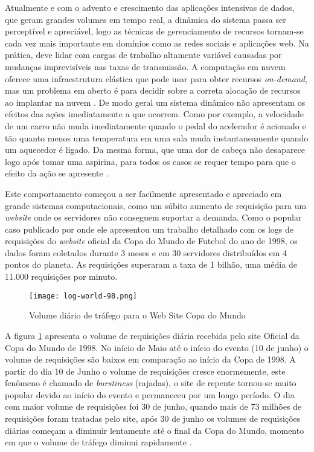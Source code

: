 Atualmente e com o advento e crescimento das aplicações intensivas de dados, que geram grandes volumes em tempo real, a dinâmica do sistema passa ser perceptível e apreciável, logo as técnicas de gerenciamento de recursos tornam-se cada vez mais importante em domínios como as redes sociais e aplicações web. Na prática, deve lidar com cargas de trabalho altamente variável causadas por mudanças imprevisíveis nas taxas de transmissão. A computação em nuvem oferece uma infraestrutura elástica que pode usar para obter recursos \textit{on-demand}, mas um problema em aberto é para decidir sobre a correta alocação de recursos ao implantar na nuvem \cite{Cervino2012}. De modo geral um sistema dinâmico não apresentam os efeitos das ações imediatamente a que ocorrem. Como por exemplo, a velocidade de um carro não muda imediatamente quando o pedal do acelerador é acionado e tão quanto menos uma temperatura em uma sala muda instantaneamente quando um aquecedor é ligado. Da mesma forma, que uma dor de cabeça não desaparece logo após tomar uma aspirina, para todos os casos se requer tempo para que o efeito da ação se apresente \cite{Karl2008}.

Este comportamento começou a ser facilmente apresentado e apreciado em grande sistemas computacionais, como um súbito aumento de requisição para um \textit{website} onde os servidores não conseguem suportar a demanda. Como o popular caso publicado por \cite{Arlitt2000} onde ele apresentou um trabalho detalhado com os logs de requisições do \textit{website} oficial da Copa do Mundo de Futebol do ano de 1998, os dados foram coletados durante 3 meses e em 30 servidores distribuídos em 4 pontos do planeta. As requisições superaram a taxa de 1 bilhão, uma média de 11.000 requisições por minuto.

\begin{figure}[htb]
	\caption{Volume diário de tráfego para o Web Site Copa do Mundo}
	\label{fig:log98}
	\centering
	\texttt{[image: log-world-98.png]}
\end{figure}

A figura \ref{fig:log98} apresenta o volume de requisições diária recebida pelo site Oficial da Copa do Mundo de 1998. No início de Maio até o início do evento (10 de junho) o volume de requisições são baixos em comparação ao início da Copa de 1998. A partir do dia 10 de Junho o volume de requisições cresce enormemente, este fenômeno é chamado de \textit{burstiness} (rajadas), o site de repente tornou-se muito popular devido ao início do evento e permaneceu por um longo período. O dia com maior volume de requisições foi 30 de junho, quando mais de 73 milhões de requisições foram tratadas pelo site, após 30 de junho os volumes de requisições diárias começam a diminuir lentamente até o final da Copa do Mundo, momento em que o volume de tráfego diminui rapidamente \cite{Arlitt2000}.

